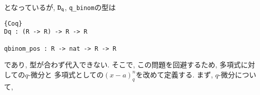 \documentclass[11pt]{jarticle}
\theoremstyle{mystyle}
\newcommand{\0}{\textbf{0}}
\newcommand{\1}{\textbf{1}}
\newcommand{\2}{\textbf{2}}
\begin{document}
となっているが, ${\tt D}_{\tt q}$, {\tt q\_binom}の型は
\begin{lstlisting}{Coq}
Dq : (R -> R) -> R -> R

qbinom_pos : R -> nat -> R -> R \end{lstlisting}
であり, 型が合わず代入できない. そこで, この問題を回避するため, 多項式に対しての$q$-微分と
多項式としての$(x - a)^n_q$を改めて定義する. まず, $q$-微分について, 
\end{document}
